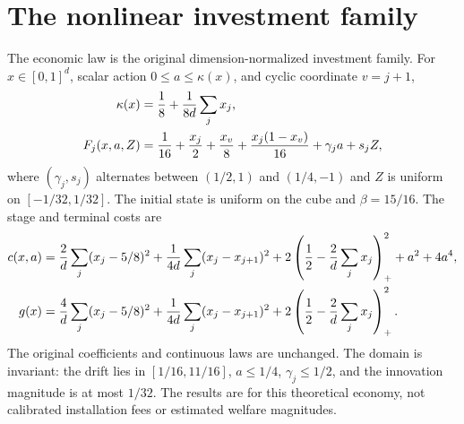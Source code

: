 \section{The nonlinear investment family}\label{sec:economy56}
The economic law is the original dimension-normalized investment family. For $x\in[0,1]^d$, scalar action $0\le a\le\kappa(x)$, and cyclic coordinate $v=j+1$,
\begin{align}\label{eq:investment56}
 \kappa(x)&=\frac18+\frac1{8d}\sum_jx_j,\\
 F_j(x,a,Z)&=\frac1{16}+\frac{x_j}{2}+\frac{x_v}{8}
              +\frac{x_j(1-x_v)}{16}+\gamma_ja+s_jZ,\notag
\end{align}
where $(\gamma_j,s_j)$ alternates between $(1/2,1)$ and $(1/4,-1)$ and $Z$ is uniform on $[-1/32,1/32]$. The initial state is uniform on the cube and $\beta=15/16$. The stage and terminal costs are
\begin{align}\label{eq:cost56}
 c(x,a)&=\frac2d\sum_j(x_j-5/8)^2+
       \frac1{4d}\sum_j(x_j-x_{j+1})^2+
       2\left(\frac12-\frac2d\sum_jx_j\right)_+^2+a^2+4a^4,\\
 g(x)&=\frac4d\sum_j(x_j-5/8)^2+
       \frac1{4d}\sum_j(x_j-x_{j+1})^2+
       2\left(\frac12-\frac2d\sum_jx_j\right)_+^2.\notag
\end{align}
The original coefficients and continuous laws are unchanged. The domain is invariant: the drift lies in $[1/16,11/16]$, $a\le1/4$, $\gamma_j\le1/2$, and the innovation magnitude is at most $1/32$. The results are for this theoretical economy, not calibrated installation fees or estimated welfare magnitudes.
